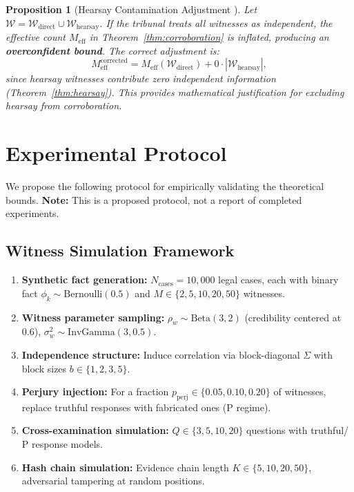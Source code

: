 \documentclass[11pt,a4paper]{article}
\newtheorem{proposition}[theorem]{Proposition}
\theoremstyle{definition}
\newcommand{\abs}[1]{\left|#1\right|}
\newcommand{\witnessSet}{\mathcal{W}}           %
\newcommand{\fact}{\phi}                        %
\newcommand{\perjury}{\mathrm{P}}               %
\begin{document}
\begin{proposition}[Hearsay Contamination Adjustment ]
\label{prop:hearsay_contamination}
Let $\witnessSet = \witnessSet_{\mathrm{direct}} \cup \witnessSet_{\mathrm{hearsay}}$. If the tribunal treats all witnesses as independent, the effective count $M_{\mathrm{eff}}$ in Theorem~\ref{thm:corroboration} is inflated, producing an \textbf{overconfident bound}. The correct adjustment is:
\begin{equation}
    M_{\mathrm{eff}}^{\mathrm{corrected}} = M_{\mathrm{eff}}(\witnessSet_{\mathrm{direct}}) + 0 \cdot \abs{\witnessSet_{\mathrm{hearsay}}},
    \label{eq:hearsay_adjustment}
\end{equation}
since hearsay witnesses contribute zero independent information (Theorem~\ref{thm:hearsay}). This provides mathematical justification for excluding hearsay from corroboration.
\end{proposition}

\section{Experimental Protocol }
\label{sec:experiments}

We propose the following protocol for empirically validating the theoretical bounds. \textbf{Note:} This is a proposed protocol, not a report of completed experiments.

\subsection{Witness Simulation Framework}

\begin{enumerate}[label=\textbf{E\arabic*}.]
    \item \textbf{Synthetic fact generation:} $N_{\mathrm{cases}} = 10{,}000$ legal cases, each with binary fact $\fact_k \sim \mathrm{Bernoulli}(0.5)$ and $M \in \{2, 5, 10, 20, 50\}$ witnesses.
    \item \textbf{Witness parameter sampling:} $\rho_w \sim \mathrm{Beta}(3, 2)$ (credibility centered at $0.6$), $\sigma_w^2 \sim \mathrm{InvGamma}(3, 0.5)$.
    \item \textbf{Independence structure:} Induce correlation via block-diagonal $\Sigma$ with block sizes $b \in \{1, 2, 3, 5\}$.
    \item \textbf{Perjury injection:} For a fraction $p_{\mathrm{perj}} \in \{0.05, 0.10, 0.20\}$ of witnesses, replace truthful responses with fabricated ones ($\perjury$ regime).
    \item \textbf{Cross-examination simulation:} $Q \in \{3, 5, 10, 20\}$ questions with truthful/$\perjury$ response models.
    \item \textbf{Hash chain simulation:} Evidence chain length $K \in \{5, 10, 20, 50\}$, adversarial tampering at random positions.
\end{enumerate}
\end{document}
